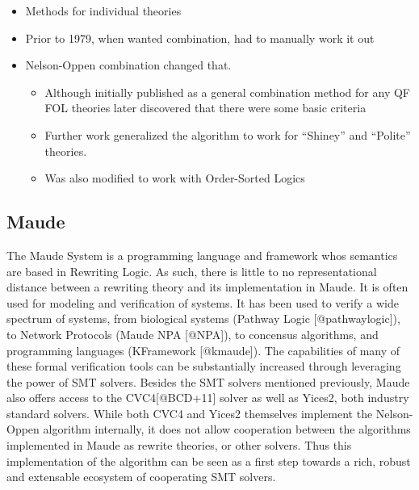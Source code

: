\documentclass[]{article}
\providecommand{\tightlist}{%
  \setlength{\itemsep}{0pt}\setlength{\parskip}{0pt}}
\begin{document}
\begin{itemize}
  \begin{itemize}
  \tightlist
  \item
    Methods for individual theories
  \item
    Prior to 1979, when wanted combination, had to manually work it out
  \item
    Nelson-Oppen combination changed that.

    \begin{itemize}
    \tightlist
    \item
      Although initially published as a general combination method for
      any QF FOL theories later discovered that there were some basic
      criteria
    \item
      Further work generalized the algorithm to work for ``Shiney'' and
      ``Polite'' theories.
    \item
      Was also modified to work with Order-Sorted Logics
    \end{itemize}
  \end{itemize}
\end{itemize}

\hypertarget{maude}{%
\subsection{Maude}\label{maude}}

The Maude System is a programming language and framework whos semantics
are based in Rewriting Logic. As such, there is little to no
representational distance between a rewriting theory and its
implementation in Maude. It is often used for modeling and verification
of systems. It has been used to verify a wide spectrum of systems, from
biological systems (Pathway Logic {[}@pathwaylogic{]}), to Network
Protocols (Maude NPA {[}@NPA{]}), to concensus algorithms, and
programming languages (KFramework {[}@kmaude{]}). The capabilities of
many of these formal verification tools can be substantially increased
through leveraging the power of SMT solvers. Besides the SMT solvers
mentioned previously, Maude also offers access to the CVC4{[}@BCD+11{]}
solver as well as Yices2, both industry standard solvers. While both
CVC4 and Yices2 themselves implement the Nelson-Oppen algorithm
internally, it does not allow cooperation between the algorithms
implemented in Maude as rewrite theories, or other solvers. Thus this
implementation of the algorithm can be seen as a first step towards a
rich, robust and extensable ecosystem of cooperating SMT solvers.
\end{document}
